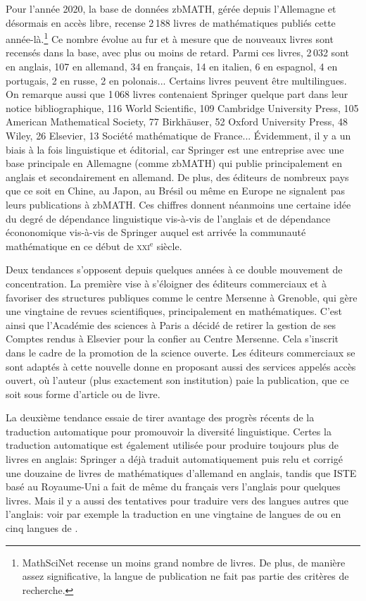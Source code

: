 Pour l'année 2020, la base de données  zbMATH, gérée depuis l'Allemagne et désormais en accès libre, recense 2\,188 livres de mathématiques publiés cette année-là.\footnote{MathSciNet recense un moins grand nombre de livres. De plus, de manière assez significative, la langue de publication ne fait pas partie des critères de recherche.} Ce nombre évolue au fur et à mesure que de nouveaux livres sont recensés dans la base, avec plus ou moins de retard. Parmi ces livres, 2\,032 sont en anglais, 107 en allemand, 34 en français, 14 en italien, 6 en espagnol, 4 en portugais, 2 en russe, 2 en polonais... Certains livres peuvent être multilingues. On remarque aussi que 1\,068 livres contenaient \og Springer \fg{} quelque part dans leur notice bibliographique, 116 \og World Scientific\fg{}, 109 \og Cambridge University Press\fg, 105 \og American Mathematical Society\fg, 77 \og Birkhäuser\fg{}, 52 \og Oxford University Press\fg, 48 \og Wiley\fg, 26 \og Elsevier\fg, 13 \og Société mathématique de France\fg{}... \'Evidemment, il y a un biais à la fois linguistique et éditorial, car Springer est une entreprise avec une base principale en Allemagne (comme zbMATH)  qui publie principalement en anglais et secondairement en allemand. De plus, des éditeurs de nombreux pays que ce soit en Chine, au Japon, au Brésil ou même en Europe ne signalent pas leurs publications à zbMATH.  Ces chiffres donnent néanmoins une certaine idée du degré de dépendance  linguistique vis-à-vis de l'anglais  et de dépendance écononomique vis-à-vis de Springer auquel est arrivée la communauté mathématique en ce début de  \textsc{xxi}$^\text{e}$ siècle.

Deux tendances s'opposent depuis quelques années à ce double mouvement de concentration. La première vise à s'éloigner des éditeurs commerciaux  et à favoriser des structures publiques comme le centre Mersenne à Grenoble, qui gère une vingtaine de revues scientifiques, principalement en mathématiques. C'est ainsi que l'Académie des sciences à Paris a décidé de retirer la gestion de ses Comptes rendus à Elsevier pour la confier au Centre Mersenne. Cela s'inscrit dans le cadre de la promotion de la \og science ouverte\fg. Les éditeurs commerciaux se sont  adaptés à cette nouvelle donne en proposant aussi des services appelés \og accès ouvert\fg{}, où l'auteur (plus exactement son institution) paie la publication, que ce soit sous forme d'article ou  de livre. 

La deuxième tendance essaie de tirer avantage des progrès récents de la traduction automatique  pour promouvoir la diversité linguistique. Certes la traduction automatique est également utilisée pour produire toujours plus de livres en anglais: Springer a déjà traduit automatiquement puis relu et corrigé une douzaine de livres de mathématiques d'allemand en anglais, tandis que ISTE basé au Royaume-Uni a  fait de même du français vers l'anglais pour quelques livres. Mais il y a aussi des tentatives pour traduire vers des langues autres que l'anglais: voir par exemple la traduction en une vingtaine de langues de \cite{Bacaer} ou en cinq langues de \cite{Bacaer2}.

